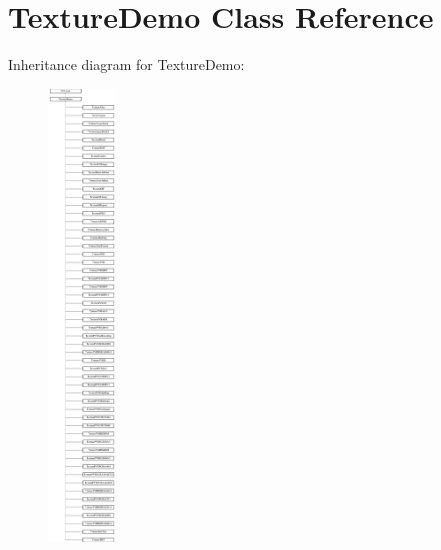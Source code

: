 \hypertarget{interface_texture_demo}{\section{Texture\-Demo Class Reference}
\label{interface_texture_demo}
}
Inheritance diagram for Texture\-Demo\-:\begin{figure}[H]
\begin{center}
\leavevmode
\includegraphics[height=12.000000cm]{interface_texture_demo}
\end{center}
\end{figure}

